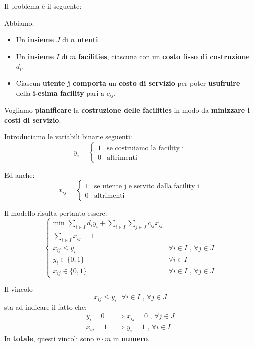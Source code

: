 Il problema è il seguente:

\begin{exa}
    Abbiamo:
    \begin{itemize}
        \item Un \textbf{insieme} $J$ di $n$ \textbf{utenti}.
        \item Un \textbf{insieme} $I$ di $m$ \textbf{facilities}, ciascuna
            con un \textbf{costo fisso di costruzione} $d_i$.
        \item Ciascun \textbf{utente j comporta} un \textbf{costo di servizio}
            per poter \textbf{usufruire} della \textbf{i-esima facility} 
            pari a $c_{ij}$.
    \end{itemize}
    Vogliamo \textbf{pianificare} la \textbf{costruzione delle facilities}
    in modo da \textbf{minizzare i costi di servizio}.
\end{exa}

Introduciamo le variabili binarie seguenti:
\[
    y_i = \begin{cases}
        1 & \text{se costruiamo la facility i} \\ 
        0 & \text{altrimenti}
    \end{cases}
\]

Ed anche:
\[
    x_{ij} = \begin{cases}
        1 & \text{se utente j e servito dalla facility i} \\ 
        0 & \text{altrimenti}
    \end{cases}
\]

Il modello risulta pertanto essere:
\[
    \begin{cases}
        \text{min } \displaystyle\sum_{i\in I} d_i y_i + 
        \sum_{i \in I} \displaystyle\sum_{j \in J} c_{ij} x_{ij} \\ 
        \sum_{i \in I} x_{ij} = 1 \\ 
        x_{ij} \le y_i & \forall i \in I \text{ , } \forall j \in J \\
        y_i \in \{0,1\} & \forall i \in I \\ 
        x_{ij} \in \{0,1\} & \forall i \in I \text{ , } \forall j \in J  
    \end{cases}
\]

\begin{remark}[VINCOLI]
    Il vincolo
    \[
        x_{ij} \le y_i \text{ } \forall i \in I \text{ , } \forall j \in J
    \] 
    sta ad indicare il fatto che:
    \[
        \begin{aligned}
            y_i = 0 &\implies x_{ij} = 0 \text{ , } \forall j \in J \\ 
            x_{ij} = 1 &\implies y_i = 1 \text{ , } \forall i \in I
        \end{aligned}
    \] 
    In \textbf{totale}, questi vincoli sono $n \cdot m$ in \textbf{numero}.
\end{remark}

